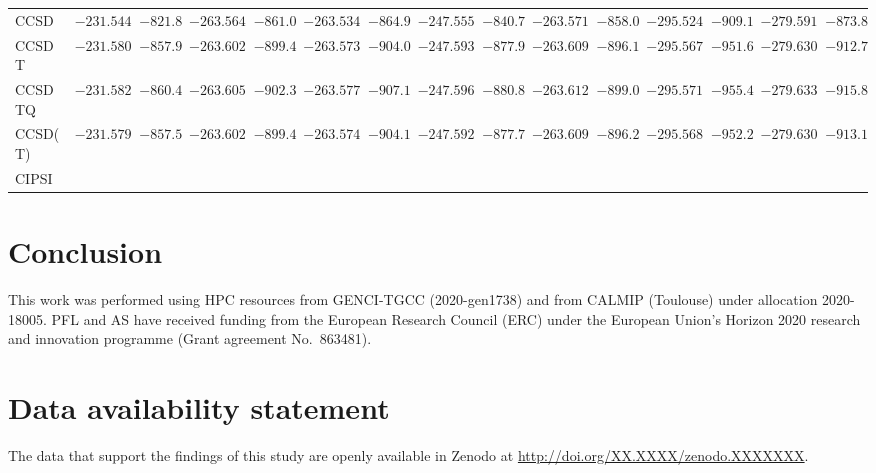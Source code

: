 \documentclass[aps,prb,reprint,noshowkeys,superscriptaddress]{revtex4-1}
\begin{document}
\begin{squeezetable}
\begin{table*}
\begin{ruledtabular}
\begin{tabular}{lcccccccccccccc}
		\hline
		CCSD	&	$-231.5440$	&	$-821.8$	&	$-263.5640$	&	$-861.0$	&	$-263.5347$	&	$-864.9$	&	$-247.5559$	&	$-840.7$	&	$-263.5716$	&	$-858.0$	&	$-295.5248$   &	$-909.1$	&	$-279.5911$   &	 $-873.8$	\\
		CCSDT	&	$-231.5802$	&	$-857.9$	&	$-263.6024$	&	$-899.4$	&	$-263.5739$	&	$-904.0$	&	$-247.5931$	&	$-877.9$	&	$-263.6097$	&	$-896.1$	&	$-295.5673$  &  $-951.6$	&	$-279.6300$    &	$-912.7$	\\
		CCSDTQ	&	$-231.5826$	&	$-860.4$		&	$-263.6053$	&	$-902.3$		&	$-263.5770$	&	$-907.1$	&	$-247.5960$	&	$-880.8$	&	$-263.6126$  & $-899.0$		&			$-295.5712$		&	$-955.4$		&	$-279.6331$		&	$-915.8$		\\
		\hline
		CCSD(T)	&	$-231.5798$	&	$-857.5$	&	$-263.6024$		&	$-899.4$	&	$-263.5740$	&	$-904.1$	&	$-247.5929$	&	$-877.7$	&	$-263.6099$	&	$-896.2$	&	$-295.5680$		&	$-952.2$	&	$-279.6305$		&	$-913.1$	\\
		\hline
		CIPSI	&				&			&				&			&				&			&				&			&				&			\\
	\end{tabular}
	\end{ruledtabular}
\end{table*}
\end{squeezetable}    


\section{Conclusion}

\begin{acknowledgements}
This work was performed using HPC resources from GENCI-TGCC (2020-gen1738) and from CALMIP (Toulouse) under allocation 2020-18005.
PFL and AS have received funding from the European Research Council (ERC) under the European Union's Horizon 2020 research and innovation programme (Grant agreement No.~863481).
\end{acknowledgements}

\section*{Data availability statement}
The data that support the findings of this study are openly available in Zenodo at \href{http://doi.org/XX.XXXX/zenodo.XXXXXXX}{http://doi.org/XX.XXXX/zenodo.XXXXXXX}.


\end{document}
